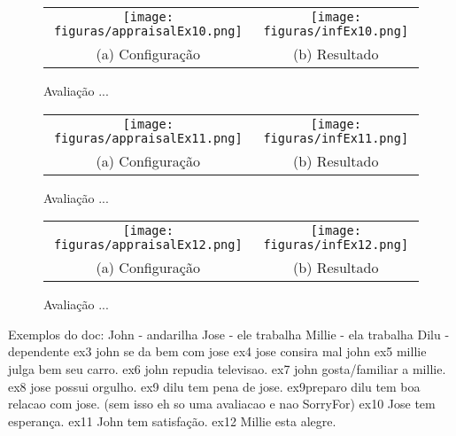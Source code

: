 \begin{figure}
  \centering
  \begin{tabular}{cc}
  \texttt{[image: figuras/appraisalEx10.png]} & \texttt{[image: figuras/infEx10.png]} \\
  (a) Configuração & (b) Resultado
  \end{tabular}
  \caption{Avaliação ...}
  \label{fig:tp:cdu:ex10}
\end{figure}

\begin{figure}
  \centering
  \begin{tabular}{cc}
  \texttt{[image: figuras/appraisalEx11.png]} & \texttt{[image: figuras/infEx11.png]} \\
  (a) Configuração & (b) Resultado
  \end{tabular}
  \caption{Avaliação ...}
  \label{fig:tp:cdu:ex11}
\end{figure}

\begin{figure}
  \centering
  \begin{tabular}{cc}
  \texttt{[image: figuras/appraisalEx12.png]} & \texttt{[image: figuras/infEx12.png]} \\
  (a) Configuração & (b) Resultado
  \end{tabular}
  \caption{Avaliação ...}
  \label{fig:tp:cdu:ex12}
\end{figure}

%
Exemplos do doc:
John - andarilha		Jose - ele trabalha			Millie - ela trabalha			Dilu - dependente
%
ex3 john se da bem com jose
ex4 jose consira mal john
ex5 millie julga bem seu carro.
ex6 john repudia televisao.
ex7 john gosta/familiar a millie.
ex8 jose possui orgulho.
ex9 dilu tem pena de jose.
	ex9preparo dilu tem boa relacao com jose. (sem isso eh so uma avaliacao e nao SorryFor)
ex10 Jose tem esperança.
ex11 John tem satisfação.
ex12 Millie esta alegre.

